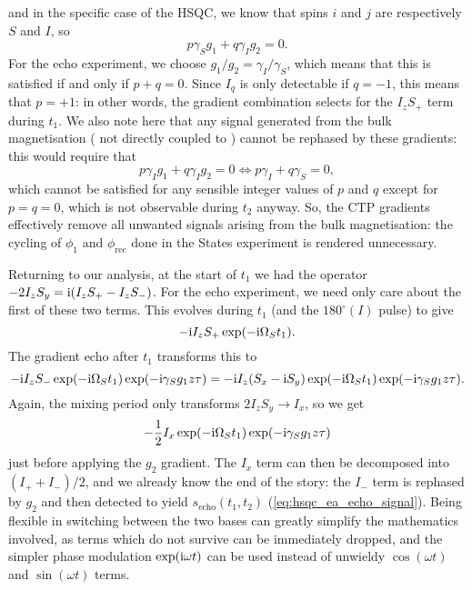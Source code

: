 and in the specific case of the HSQC, we know that spins $i$ and $j$ are respectively $S$ and $I$, so
\begin{equation}
    \label{eq:gradient_refocusing_hsqc}
    p\gamma_S g_1 + q\gamma_I g_2 = 0.
\end{equation}
For the echo experiment, we choose $g_1/g_2 = \gamma_I/\gamma_S$, which means that this is satisfied if and only if $p + q = 0$.
Since $I_{q}$ is only detectable if $q = -1$, this means that $p = +1$: in other words, the gradient combination selects for the $I_zS_+$ term during $t_1$.
We also note here that any signal generated from the bulk magnetisation (\proton{} not directly coupled to \carbon{}) cannot be rephased by these gradients: this would require that
\begin{equation}
    \label{eq:unrefocusable_bulk}
    p\gamma_I g_1 + q\gamma_I g_2 = 0 \Leftrightarrow p \gamma_I + q\gamma_S = 0,
\end{equation}
which cannot be satisfied for any sensible integer values of $p$ and $q$ except for $p = q = 0$, which is not observable during $t_2$ anyway.
So, the CTP gradients effectively remove all unwanted signals arising from the bulk magnetisation: the cycling of $\phi_1$ and $\phi_\text{rec}$ done in the States experiment is rendered unnecessary.

Returning to our analysis, at the start of $t_1$ we had the operator $-2I_zS_y = \mathrm{i}(I_zS_+ - I_zS_-)$.
For the echo experiment, we need only care about the first of these two terms.
This evolves during $t_1$ (and the $180^\circ(I)$ pulse) to give
\begin{equation}
    \label{eq:hsqc_echo_shift_aftert1}
    -\mathrm{i} I_zS_+ \exp(-\mathrm{i} \Omega_S t_1).
\end{equation}
The gradient echo after $t_1$ transforms this to
\begin{equation}
    \label{eq:hsqc_echo_shift_after_g1}
    -\mathrm{i} I_zS_- \exp(-\mathrm{i} \Omega_S t_1)\exp(-\mathrm{i} \gamma_S g_1 z\tau) = -\mathrm{i} I_z(S_x - \mathrm{i} S_y) \exp(-\mathrm{i} \Omega_S t_1)\exp(-\mathrm{i} \gamma_S g_1 z\tau).
\end{equation}
Again, the mixing period only transforms $2I_zS_y \to I_x$, so we get
\begin{equation}
    \label{eq:hsqc_echo_shift_before_g2}
    -\frac{1}{2} I_x \exp(-\mathrm{i} \Omega_S t_1)\exp(-\mathrm{i} \gamma_S g_1 z\tau)
\end{equation}
just before applying the $g_2$ gradient.
The $I_x$ term can then be decomposed into $(I_+ + I_-)/2$, and we already know the end of the story: the $I_-$ term is rephased by $g_2$ and then detected to yield $s_\text{echo}(t_1, t_2)$ (\cref{eq:hsqc_ea_echo_signal}).
Being flexible in switching between the two bases can greatly simplify the mathematics involved, as terms which do not survive can be immediately dropped, and the simpler phase modulation $\exp(\mathrm{i}\omega t)$ can be used instead of unwieldy $\cos(\omega t)$ and $\sin(\omega t)$ terms.

